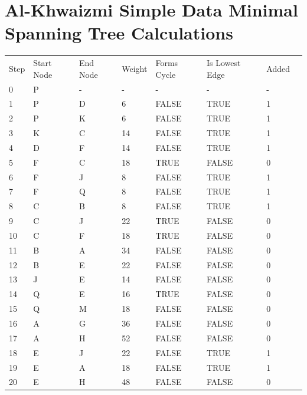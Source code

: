 \documentclass[11pt]{book}
\renewcommand{\=}[1]{\stackrel{#1}{=}} %
\theoremstyle{definition}
\theoremstyle{remark}
\begin{document}
\section{Al-Khwaizmi Simple Data Minimal Spanning Tree Calculations}
\begin{table}[]
\begin{tabular}{llllllll}
Step & Start Node & End Node & Weight & Forms Cycle & Is Lowest Edge & Added &  \\
0 & P & - & - & - & - & - &  \\
1 & P & D & 6 & FALSE & TRUE & \cellcolor[HTML]{67FD9A}1 &  \\
2 & P & K & 6 & FALSE & TRUE & \cellcolor[HTML]{67FD9A}1 &  \\
3 & K & C & 14 & FALSE & TRUE & \cellcolor[HTML]{67FD9A}1 &  \\
4 & D & F & 14 & FALSE & TRUE & \cellcolor[HTML]{67FD9A}1 &  \\
5 & F & C & 18 & TRUE & FALSE & \cellcolor[HTML]{FD6864}0 &  \\
6 & F & J & 8 & FALSE & TRUE & \cellcolor[HTML]{67FD9A}1 &  \\
7 & F & Q & 8 & FALSE & TRUE & \cellcolor[HTML]{67FD9A}1 &  \\
8 & C & B & 8 & FALSE & TRUE & \cellcolor[HTML]{67FD9A}1 &  \\
9 & C & J & 22 & TRUE & FALSE & \cellcolor[HTML]{FD6864}0 &  \\
10 & C & F & 18 & TRUE & FALSE & \cellcolor[HTML]{FD6864}0 &  \\
11 & B & A & 34 & FALSE & FALSE & \cellcolor[HTML]{FD6864}0 &  \\
12 & B & E & 22 & FALSE & FALSE & \cellcolor[HTML]{FD6864}0 &  \\
13 & J & E & 14 & FALSE & FALSE & \cellcolor[HTML]{FD6864}0 &  \\
14 & Q & E & 16 & TRUE & FALSE & \cellcolor[HTML]{FD6864}0 &  \\
15 & Q & M & 18 & FALSE & FALSE & \cellcolor[HTML]{FD6864}0 &  \\
16 & A & G & 36 & FALSE & FALSE & \cellcolor[HTML]{FD6864}0 &  \\
17 & A & H & 52 & FALSE & FALSE & \cellcolor[HTML]{FD6864}0 &  \\
18 & E & J & 22 & FALSE & TRUE & \cellcolor[HTML]{67FD9A}1 &  \\
19 & E & A & 18 & FALSE & TRUE & \cellcolor[HTML]{67FD9A}1 &  \\
20 & E & H & 48 & FALSE & FALSE & \cellcolor[HTML]{FD6864}0 &  \\

\end{tabular}
\end{table}
\end{document}
